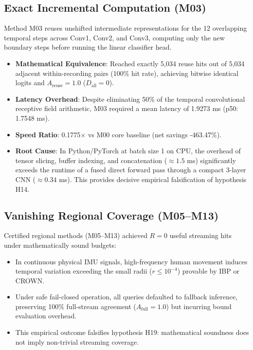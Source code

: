 \documentclass[10pt,twocolumn]{article}
\begin{document}
\subsection{Exact Incremental Computation (M03)}
Method M03 reuses unshifted intermediate representations for the 12 overlapping temporal steps across Conv1, Conv2, and Conv3, computing only the new boundary steps before running the linear classifier head.
\begin{itemize}
    \item \textbf{Mathematical Equivalence}: Reached exactly 5,034 reuse hits out of 5,034 adjacent within-recording pairs (100\% hit rate), achieving bitwise identical logits and $A_{\text{reuse}} = 1.0$ ($D_{\text{all}} = 0$).
    \item \textbf{Latency Overhead}: Despite eliminating 50\% of the temporal convolutional receptive field arithmetic, M03 required a mean latency of 1.9273 ms (p50: 1.7548 ms).
    \item \textbf{Speed Ratio}: 0.1775$\times$ vs M00 core baseline (net savings -463.47\%).
    \item \textbf{Root Cause}: In Python/PyTorch at batch size 1 on CPU, the overhead of tensor slicing, buffer indexing, and concatenation ($\approx 1.5$ ms) significantly exceeds the runtime of a fused direct forward pass through a compact 3-layer CNN ($\approx 0.34$ ms). This provides decisive empirical falsification of hypothesis H14.
\end{itemize}

\subsection{Vanishing Regional Coverage (M05--M13)}
Certified regional methods (M05--M13) achieved $R = 0$ useful streaming hits under mathematically sound budgets:
\begin{itemize}
    \item In continuous physical IMU signals, high-frequency human movement induces temporal variation exceeding the small radii ($r \le 10^{-4}$) provable by IBP or CROWN.
    \item Under safe fail-closed operation, all queries defaulted to fallback inference, preserving 100\% full-stream agreement ($A_{\text{full}} = 1.0$) but incurring bound evaluation overhead.
    \item This empirical outcome falsifies hypothesis H19: mathematical soundness does not imply non-trivial streaming coverage.
\end{itemize}
\end{document}
